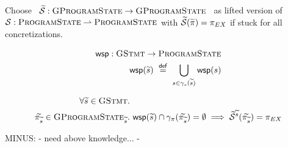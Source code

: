 
Choose ~$\widetilde{\mathcal{S}} : \textsc{GProgramState} \rightarrow \textsc{GProgramState}$~ as lifted version of ~$\mathcal{S} : \textsc{ProgramState} \rightharpoonup \textsc{ProgramState}$ with $\widetilde{\mathcal{S}}(\widetilde{\pi}) = \pi_{EX}$ if stuck for all concretizations.

\begin{align*}
\textup{\textsf{wsp}} : \textsc{GStmt} \rightarrow \textsc{ProgramState} \\
\textup{\textsf{wsp}}(\widetilde{s}) ~\overset{\textup{\textsf{def}}}{=}~ \bigcup_{s \in \gamma_s(\widetilde{s})} \textup{\textsf{wsp}}(s)
\end{align*}

\begin{align*}
\forall \widetilde{s} \in \textsc{GStmt}.~&\\ 
\widetilde{\pi_{\widetilde{s}}} \in \textsc{GProgramState}_{\widetilde{s}}.~& \textup{\textsf{wsp}}(\widetilde{s}) \cap \gamma_{\pi}(\widetilde{\pi_{\widetilde{s}}}) = \emptyset
\implies
\widetilde{\mathcal{S}}^{\widetilde{s}}(\widetilde{\pi_{\widetilde{s}}}) = \pi_{EX}
\end{align*}
 
 
MINUS:
- need above knowledge...
- 
